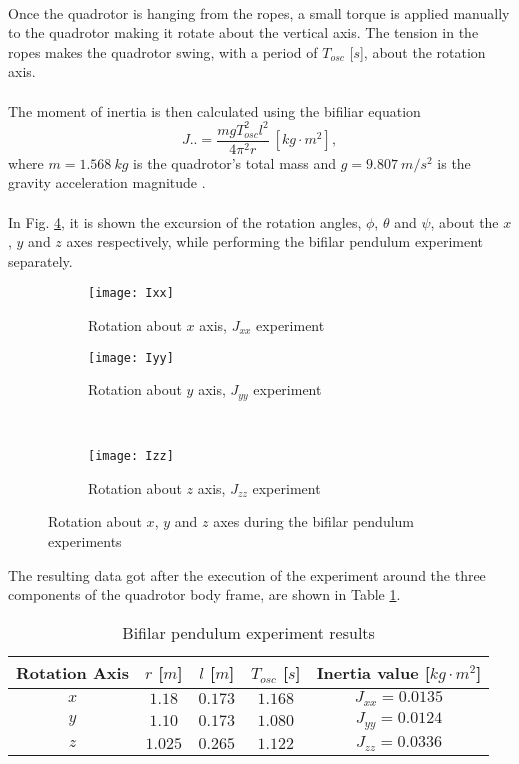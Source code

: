 \\Once the quadrotor is hanging from the ropes, a small torque is applied manually to the quadrotor making it rotate about the vertical axis. The tension in the ropes makes the quadrotor swing, with a period of $T_{osc}$ [$s$], about the rotation axis.
\\\\
The moment of inertia is then calculated using the bifiliar equation
\begin{equation}
J.. = \dfrac{mgT_{osc}^{2}l^{2}}{4\pi^{2}r}\ [kg\cdot m^{2}],
\end{equation}
where $m = 1.568\ kg$ is the quadrotor's total mass and $g = 9.807\ m/s^{2}$ is the gravity acceleration magnitude \cite{Mustapa2016}.
\\\\
In Fig. \ref{fig:inertiatest}, it is shown the excursion of the rotation angles, $\phi$, $\theta$ and $\psi$, about the $x$, $y$ and $z$ axes respectively, while performing the bifilar pendulum experiment separately.
\begin{figure}[H]
\begin{subfigure}{.5\linewidth}
\centering
\texttt{[image: Ixx]}
\caption{Rotation about $x$ axis, $J_{xx}$ experiment}
\label{fig:Jxx}
\end{subfigure}%
\begin{subfigure}{.5\linewidth}
\centering
\texttt{[image: Iyy]}
\caption{Rotation about $y$ axis, $J_{yy}$ experiment}
\label{fig:Jyy}
\end{subfigure}\\[1ex]
\begin{subfigure}{\linewidth}
\centering
\texttt{[image: Izz]}
\caption{Rotation about $z$ axis, $J_{zz}$ experiment}
\label{fig:Jzz}
\end{subfigure}
\caption{Rotation about $x$, $y$ and $z$ axes during the bifilar pendulum experiments}
\label{fig:inertiatest}
\end{figure}
The resulting data got after the execution of the experiment around the three components of the quadrotor body frame, are shown in Table \ref{tb:inertiaexperiment}.
\begin{table}[H]
\small
\begin{center}
\caption{Bifilar pendulum experiment results}\label{tb:inertiaexperiment}
\begin{tabular}{c|c|c|c|c}\hline
\rule{0pt}{3ex} Rotation Axis & $r$ [$m$] & $l$ [$m$] & $T_{osc}$ [$s$] & Inertia value [$kg\cdot m^{2}$] \\\hline\hline
\rule{0pt}{3ex} $x$ &  $1.18$ & $0.173$ & $1.168$ & $J_{xx} = 0.0135$ \\[0.7ex]
$y$ &  $1.10$ & $0.173$ & $1.080$ & $J_{yy} = 0.0124$ \\[0.7ex]
$z$ &  $1.025$ & $0.265$ & $1.122$ & $J_{zz} = 0.0336$ \\[0.7ex]\hline
\end{tabular}
\end{center}
\end{table}

